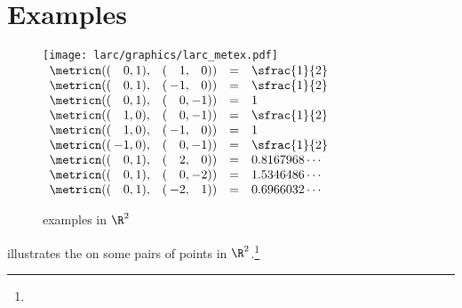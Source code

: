 \section{Examples}
\begin{figure}
  \centering%
  \gsize%
  \texttt{[image: larc/graphics/larc\_metex.pdf]}
  \hspace{10mm}
  $\begin{array}[b]{l @{\hspace{2pt}}r@{\hspace{2pt}}r l @{\hspace{2pt}}r@{\hspace{2pt}}r cl}
    \metricn((& 0,& 1),&(& 1,& 0)) &=& \sfrac{1}{2}    \\
    \metricn((& 0,& 1),&(&-1,& 0)) &=& \sfrac{1}{2}    \\
    \metricn((& 0,& 1),&(& 0,&-1)) &=& 1               \\
    \metricn((& 1,& 0),&(& 0,&-1)) &=& \sfrac{1}{2}    \\
    \metricn((& 1,& 0),&(&-1,& 0)) &=& 1               \\
    \metricn((&-1,& 0),&(& 0,&-1)) &=& \sfrac{1}{2}    \\
    \metricn((& 0,& 1),&(& 2,& 0)) &=& 0.8167968\cdots \\
    \metricn((& 0,& 1),&(& 0,&-2)) &=& 1.5346486\cdots \\
    \metricn((& 0,& 1),&(&-2,& 1)) &=& 0.6966032\cdots
  \end{array}$
  \caption{ examples in $\R^2$\label{fig:larcmet}}
\end{figure}


\begin{example}
\label{ex:larcR2}
 illustrates the  on some pairs of points in $\R^2$.\footnote{}
\end{example}


